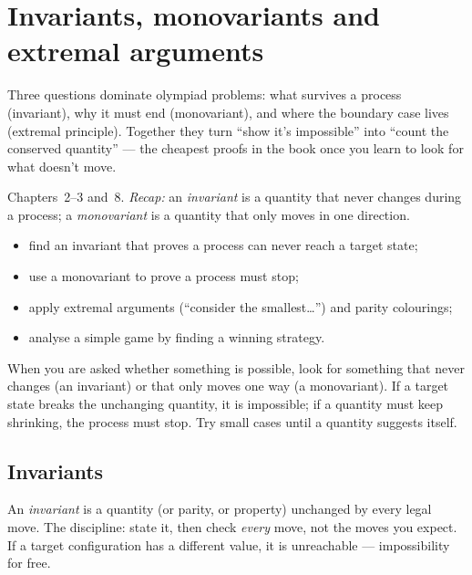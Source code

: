 \chapter{Invariants, monovariants and extremal arguments}

Three questions dominate olympiad problems: what survives a process
(invariant), why it must end (monovariant), and where the boundary case
lives (extremal principle). Together they turn ``show it's impossible''
into ``count the conserved quantity'' --- the cheapest proofs in the
book once you learn to look for what doesn't move.

\begin{rulebox}
Chapters~2--3 and~8. \emph{Recap:} an \emph{invariant} is a quantity that never changes during a process; a \emph{monovariant} is a quantity that only moves in one direction.
\end{rulebox}
\begin{wins}
\begin{itemize}
\item find an invariant that proves a process can never reach a target state;
\item use a monovariant to prove a process must stop;
\item apply extremal arguments (``consider the smallest\dots'') and parity colourings;
\item analyse a simple game by finding a winning strategy.
\end{itemize}
\end{wins}
\begin{principle}
When you are asked whether something is possible, look for something that never changes (an invariant) or that only moves one way (a monovariant). If a target state breaks the unchanging quantity, it is impossible; if a quantity must keep shrinking, the process must stop. Try small cases until a quantity suggests itself.
\end{principle}

\section{Invariants}
An \emph{invariant} is a quantity (or parity, or property) unchanged by
every legal move. The discipline: state it, then check \emph{every}
move, not the moves you expect. If a target configuration has a
different value, it is unreachable --- impossibility for free.

